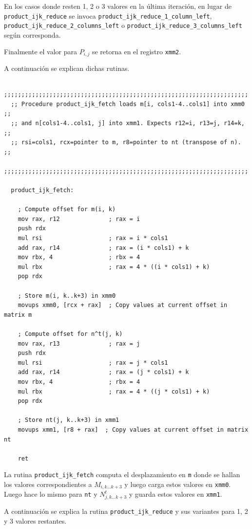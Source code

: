 \documentclass[a4paper, 10pt, twoside]{article}
\newcommand{\cc}[1]{\texttt{#1}}
\begin{document}
En los casos donde resten 1, 2 o 3 valores en la última iteración, en lugar de
\cc{product\_ijk\_reduce} se invoca \cc{product\_ijk\_reduce\_1\_column\_left},
\cc{product\_ijk\_reduce\_2\_columns\_left} o
\cc{product\_ijk\_reduce\_3\_columns\_left} según corresponda.

Finalmente el valor para $P_{i,j}$ se retorna en el registro \cc{xmm2}.

A continuación se explican dichas rutinas.

\begin{verbatim}
  ;;;;;;;;;;;;;;;;;;;;;;;;;;;;;;;;;;;;;;;;;;;;;;;;;;;;;;;;;;;;;;;;;;;;;;
  ;; Procedure product_ijk_fetch loads m[i, cols1-4..cols1] into xmm0 ;;
  ;; and n[cols1-4..cols1, j] into xmm1. Expects r12=i, r13=j, r14=k, ;;
  ;; rsi=cols1, rcx=pointer to m, r8=pointer to nt (transpose of n).  ;;
  ;;;;;;;;;;;;;;;;;;;;;;;;;;;;;;;;;;;;;;;;;;;;;;;;;;;;;;;;;;;;;;;;;;;;;;

  product_ijk_fetch:

    ; Compute offset for m(i, k)
    mov rax, r12              ; rax = i
    push rdx
    mul rsi                   ; rax = i * cols1
    add rax, r14              ; rax = (i * cols1) + k
    mov rbx, 4                ; rbx = 4
    mul rbx                   ; rax = 4 * ((i * cols1) + k)
    pop rdx

    ; Store m(i, k..k+3) in xmm0
    movups xmm0, [rcx + rax]  ; Copy values at current offset in matrix m

    ; Compute offset for n^t(j, k)
    mov rax, r13              ; rax = j
    push rdx
    mul rsi                   ; rax = j * cols1
    add rax, r14              ; rax = (j * cols1) + k
    mov rbx, 4                ; rbx = 4
    mul rbx                   ; rax = 4 * ((j * cols1) + k)
    pop rdx

    ; Store nt(j, k..k+3) in xmm1
    movups xmm1, [r8 + rax]  ; Copy values at current offset in matrix nt

    ret
\end{verbatim}

La rutina \cc{product\_ijk\_fetch} computa el desplazamiento en \cc{m} donde se
hallan los valores correspondientes a $M_{i,k \ldots k+3}$ y luego carga estos
valores en \cc{xmm0}. Luego hace lo mismo para \cc{nt} y $N^{t}_{j,k \ldots
k+3}$ y guarda estos valores en \cc{xmm1}.

A continuación se explica la rutina \cc{product\_ijk\_reduce} y sus variantes
para 1, 2 y 3 valores restantes.
\end{document}
